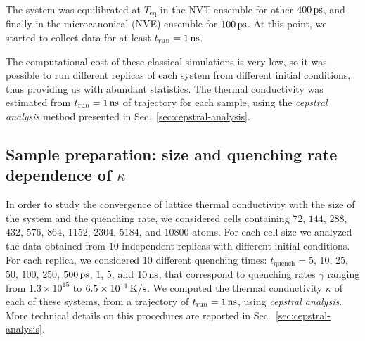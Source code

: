 The system was equilibrated at $T_{\mathrm{eq}}$ in the NVT ensemble for other $400\,\mathrm{ps}$, and finally in the microcanonical (NVE) ensemble for $100\,\mathrm{ps}$. 
At this point, we started to collect data for at least $t_{\mathrm{run}} = 1\,\mathrm{ns}$. 

The computational cost of these classical simulations is very low, so it was possible to run different replicas of each system from different initial conditions, thus providing us with abundant statistics. 
The thermal conductivity was estimated from $t_{\mathrm{run}} = 1\,\mathrm{ns}$ of trajectory for each sample, using the \emph{cepstral analysis} method presented in Sec.~\ref{sec:cepstral-analysis}.



\subsection{Sample preparation: size and quenching rate dependence of \texorpdfstring{$\kappa$}{thermal conductivity}}  \label{sec:results-class-quench}
In order to study the convergence of lattice thermal conductivity with the size of the system and the quenching rate, we considered cells containing $72$, $144$, $288$, $432$, $576$, $864$, $1152$, $2304$, $5184$, and $10800$ atoms. For each cell size we analyzed the data obtained from $10$ independent replicas with different initial conditions. 
For each replica, we considered $10$ different quenching times: $t_{\mathrm{quench}} = 5$, $10$, $25$, $50$, $100$, $250$, $500\,\mathrm{ps}$, $1$, $5$, and $10\,\mathrm{ns}$, that correspond to quenching rates $\gamma$ ranging from $1.3\times 10^{15}$ to $6.5\times 10^{11}\,\mathrm{K/s}$.
We computed the thermal conductivity $\kappa$ of each of these systems, from a trajectory of $t_\mathrm{run}=1\,\mathrm{ns}$, using \emph{cepstral analysis}. More technical details on this procedures are reported in Sec.~\ref{sec:cepstral-analysis}. 

